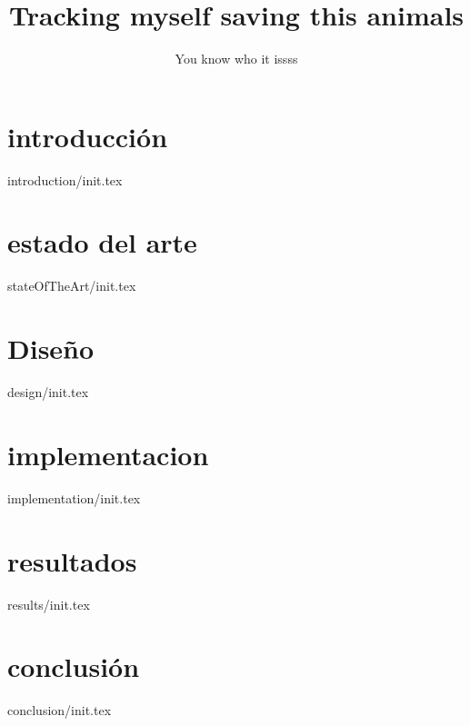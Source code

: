 \documentclass[epsbased,final,covers]{tfgtfmthesisuam}
\title[CV goalkeeper]{Tracking myself saving this animals}
\author{You know who it issss}
\begin{document}
\part[introducción]{introducción}{introduction/init.tex}
\part[estado del arte]{estado del arte}{stateOfTheArt/init.tex}
\part[diseño]{Diseño}{design/init.tex}
\part[implementación]{implementacion}{implementation/init.tex}
\part[resultados]{resultados}{results/init.tex}
\part[conclusión]{conclusión}{conclusion/init.tex}
\end{document}
